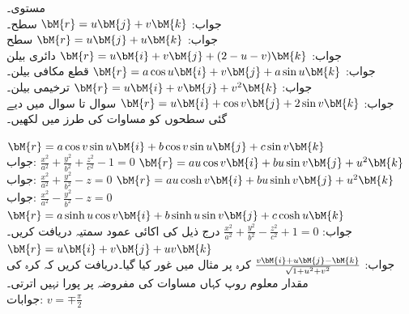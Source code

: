 \quad {} مستوی۔\\
جواب:\quad
$\bM{r}=u\bM{j}+v\bM{k}$
\quad {} سطح۔\\
جواب:\quad
$\bM{r}=u\bM{j}+u\bM{k}$
\quad سطح \\
جواب:\quad 
$\bM{r}=u\bM{i}+v\bM{j}+(2-u-v)\bM{k}$
\quad دائری بیلن \\
جواب:\quad
$\bM{r}=a\cos u\bM{i}+v\bM{j}+a\sin u\bM{k}$
\quad {} قطع مکافی بیلن۔\\
جواب:\quad
$\bM{r}=u\bM{i}+v\bM{j}+v^2\bM{k}$
\quad {} ترخیمی بیلن۔\\
جواب:\quad
$\bM{r}=u\bM{i}+\cos v\bM{j}+2\sin v\bM{k}$
سوال  تا سوال   میں دیے گئی سطحوں کو مساوات  کی طرز میں لکھیں۔

\quad
$\bM{r}=a\cos v\sin u\bM{i}+b\cos v\sin u\bM{j}+c\sin v\bM{k}$\\
جواب:\quad
$\tfrac{x^2}{a^2}+\tfrac{y^2}{b^2}+\tfrac{z^2}{c^2}-1=0$
\quad
$\bM{r}=au\cos v\bM{i}+bu\sin v\bM{j}+u^2\bM{k}$\\
جواب:\quad
$\tfrac{x^2}{a^2}+\tfrac{y^2}{b^2}-z=0$
\quad
$\bM{r}=au\cosh v\bM{i}+bu\sinh v\bM{j}+u^2\bM{k}$\\
جواب:\quad
$\tfrac{x^2}{a^2}-\tfrac{y^2}{b^2}-z=0$
\quad
$\bM{r}=a\sinh u\cos v\bM{i}+b\sinh u\sin v\bM{j}+c\cosh u\bM{k}$\\
جواب:\quad
$\tfrac{x^2}{a^2}+\tfrac{y^2}{b^2}-\tfrac{z^2}{c^2}+1=0$
\quad درج ذیل کی اکائی عمود سمتیہ دریافت کریں۔
$\bM{r}=u\bM{i}+v\bM{j}+uv\bM{k}$\\
جواب:\quad
$\tfrac{v\bM{i}+u\bM{j}-\bM{k}}{\sqrt{1+u^2+v^2}}$
\quad کرہ پر مثال  میں غور کیا گیا۔دریافت کریں کہ کرہ کی مقدار معلوم روپ کہاں مساوات  کی مفروضہ پر پورا نہیں اترتی۔\\
جوابات:\quad
$v=\mp \tfrac{\pi}{2}$

